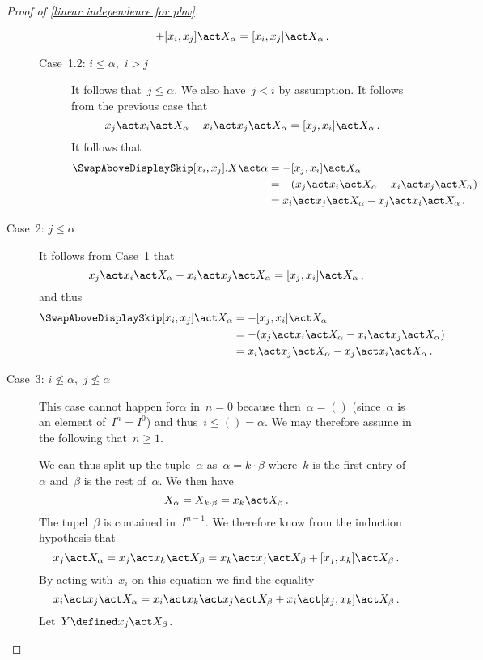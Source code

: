 \begin{proof}[Proof of \cref{linear independence for pbw}]
\begin{description}
\begin{description}
\[						+ [x_i, x_j] \act X_\alpha
						=
						[x_i, x_j] \act X_\alpha \,.
					\]
				\item[Case~1.2: $i \leq \alpha$,~$i > j$]
					It follows that~$j \leq \alpha$.
					We also have~$j < i$ by assumption.
					It follows from the previous case that
					\[
						x_j \act x_i \act X_\alpha - x_i \act x_j \act X_\alpha
						=
						[x_j, x_i] \act X_\alpha \,.
					\]
					It follows that
					\begin{align*}
						\SwapAboveDisplaySkip
						[x_i, x_j].X \act \alpha
						&=
						-[x_j, x_i] \act X_\alpha
						\\
						&=
						- (x_j \act x_i \act X_\alpha - x_i \act x_j \act X_\alpha)
						\\
						&=
						x_i \act x_j \act X_\alpha - x_j \act x_i \act X_\alpha \,.
					\end{align*}
			\end{description}
		\item[Case~2: $j \leq \alpha$]
			\label{second element is smaller than monomial}
			It follows from Case~1 that
			\[
				x_j \act x_i \act X_\alpha - x_i \act x_j \act X_\alpha
				=
				[x_j, x_i] \act X_\alpha \,,
			\]
			and thus
			\begin{align*}
				\SwapAboveDisplaySkip
				[x_i, x_j] \act X_\alpha
				&=
				-[x_j, x_i] \act X_\alpha
				\\
				&=
				- (x_j \act x_i \act X_\alpha - x_i \act x_j \act X_\alpha)
				\\
				&=
				x_i \act x_j \act X_\alpha - x_j \act x_i \act X_\alpha \,.
			\end{align*}
		\item[Case~3: $i \nleq \alpha$,~$j \nleq \alpha$]
			This case cannot happen for$\alpha$ in~$n = 0$ because then~$\alpha = ()$ (since~$\alpha$ is an element of~$I^n = I^0$) and thus~$i \leq () = \alpha$.
			We may therefore assume in the following that~$n \geq 1$.

			We can thus split up the tuple~$\alpha$ as~$\alpha = k \cdot \beta$ where~$k$ is the first entry of~$\alpha$ and~$\beta$ is the rest of~$\alpha$.
			We then have
			\[
				X_\alpha
				=
				X_{k \cdot \beta}
				=
				x_k \act X_\beta \,.
			\]
			The tupel~$\beta$ is contained in~$I^{n-1}$.
			We therefore know from the induction hypothesis that
			\[
				x_j \act X_\alpha
				=
				x_j \act x_k \act X_\beta
				=
				x_k \act x_j \act X_\beta 
				+ [x_j, x_k] \act X_\beta  \,.
			\]
			By acting with~$x_i$ on this equation we find the equality
			\begin{equation}
				\label{long equation}
				x_i \act x_j \act X_\alpha
				=
				x_i \act x_k \act x_j \act X_\beta
				+ x_i \act [x_j,x_k] \act X_\beta \,.
			\end{equation}
			Let~$Y \defined x_j \act X_\beta$.


\end{description}
\end{proof}
